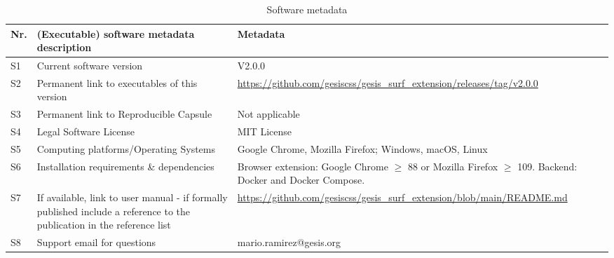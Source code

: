 \documentclass[preprint,12pt,a4paper]{elsarticle}
\begin{document}
  \begin{table}[!h]
    \begin{tabular}{|l|p{5.8cm}|p{5.8cm}|}
      \hline
      \textbf{Nr.} & \textbf{(Executable) software metadata description}                                                                    & \textbf{Metadata}                                                                             \\
      \hline
      S1           & Current software version                                                                                               & V2.0.0                                                                                                          \\
      \hline
      S2           & Permanent link to executables of this version                                                                          & \url{https://github.com/gesiscss/gesis_surf_extension/releases/tag/v2.0.0}                                                 \\
      \hline
      S3           & Permanent link to Reproducible Capsule                                                                                 & Not applicable                                                                                                  \\
      \hline
      S4           & Legal Software License                                                                                                 & MIT License                                                                                                     \\
      \hline
      S5           & Computing platforms/Operating Systems                                                                                  & Google Chrome, Mozilla Firefox; Windows, macOS, Linux                                                           \\
      \hline
      S6           & Installation requirements \& dependencies                                                                              & Browser extension: Google Chrome $\geq$ 88 or Mozilla Firefox $\geq$ 109. Backend: Docker and Docker Compose.   \\
      \hline
      S7           & If available, link to user manual - if formally published include a reference to the publication in the reference list & \url{https://github.com/gesiscss/gesis_surf_extension/blob/main/README.md}                                      \\
      \hline
      S8           & Support email for questions                                                                                            & mario.ramirez@gesis.org                                                                                         \\
      \hline
    \end{tabular}
    \caption{Software metadata}
    \label{executableMetadata}
  \end{table}
\end{document}
